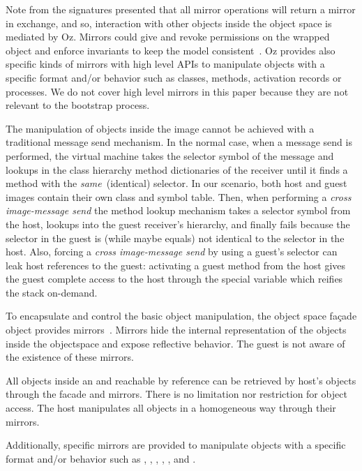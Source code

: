 Note from the signatures presented that all mirror operations will return a mirror in exchange, and so, interaction with other objects inside the object space is mediated by Oz. Mirrors could give and revoke permissions on the wrapped object and enforce invariants to keep the model consistent~\cite{Teru13a}.
Oz provides also specific kinds of mirrors with high level APIs to manipulate objects with a specific format and/or behavior such as classes, methods, activation records or processes. We do not cover high level mirrors in this paper because they are not relevant to the bootstrap process.


The manipulation of objects inside the \objectspace image cannot be achieved with a traditional message send mechanism. In the normal case, when a message send is performed, the virtual machine takes the selector symbol of the message and lookups in the class hierarchy method dictionaries of the receiver until it finds a method with the \emph{same}~(identical) selector. In our scenario, both host and guest images contain their own  class and symbol table. Then, when performing a \emph{cross image-message send} the method lookup mechanism takes a selector symbol from the host, lookups into the guest receiver's hierarchy, and finally fails because  the selector in the guest is (while maybe equals) not identical to the selector in the host. Also, forcing a \emph{cross image-message send} by using a guest's selector can leak host references to the guest: activating a guest method from the host gives the guest complete access to the host through the  special variable which reifies the stack on-demand.

To encapsulate and control the basic object manipulation, the object space fa\c{c}ade object provides mirrors~\cite{Brac04b}. Mirrors hide the internal representation of the objects inside the objectspace and expose reflective behavior. The guest is not aware of the existence of these mirrors.

All objects inside an \objectspace and reachable by reference can be retrieved by host's objects through the \objectspace facade and mirrors. 
There is no limitation nor restriction for object access. 
The host manipulates all objects in a homogeneous way through their mirrors. 

Additionally, specific mirrors are provided to manipulate objects with a specific format and/or behavior such as , , , , , and .

